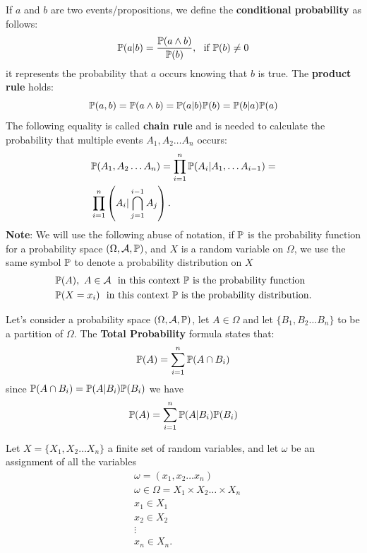 \documentclass[10pt, letterpaper]{report}
\begin{document}
If $a$ and $b$ are two events/propositions, we define the \textbf{conditional probability} as follows:\begin{equation}
	\Prob(a|b)=\frac{\Prob(a\land b)}{\Prob(b)}, \ \ \text{if }\Prob(b)\ne0
\end{equation}
it represents the probability that $a$ occurs knowing that $b$ is true. The \textbf{product rule} holds:\begin{equation}
	{\mathbb P}(a,b)={\mathbb P}(a\land b)={\mathbb P}(a|b){\mathbb P}(b)={\mathbb P}(b|a){\mathbb P}(a)
\end{equation}
The following equality is called \textbf{chain rule} and is needed to calculate the probability that multiple events $A_1,A_2\dots A_n$ occurs:\begin{align}
	 & {\mathbb P}(A_1,A_2\dots A_n)=\prod_{i=1}^n{\mathbb P}(A_i|A_1,\dots A_{i-1})=
	\\ &\prod_{i=1}^n\left( A_i|\bigcap_{j=1}^{i-1} A_j \right).
\end{align}
\textbf{Note}: We will use the following abuse of notation, if ${\mathbb P}$ is the probability function for a probability space $(\Omega,\mathcal A,{\mathbb P})$, and $X$ is a random variable on $\Omega$, we use the same symbol ${\mathbb P}$ to denote a probability distribution on $X$\begin{align}
	 & {\mathbb P}(A), \ A\in\mathcal A \ \ \text{in this context ${\mathbb P}$ is the probability function} \\
	 & {\mathbb P}(X=x_i) \ \ \text{in this context ${\mathbb P}$ is the probability distribution.}
\end{align}
\begin{theorem}
	Let's consider a probability space $(\Omega,\mathcal A, {\mathbb P})$, let $A\in \Omega$ and let $\{B_1,B_2\dots B_n\}$ to be a partition of $\Omega$. The \textbf{Total Probability} formula states that:\begin{equation}
		{\mathbb P}(A)=\sum_{i=1}^n{\mathbb P}(A\cap B_i)
	\end{equation}
	since ${\mathbb P}(A\cap B_i)={\mathbb P}(A|B_i){\mathbb P}(B_i)$ we have\begin{equation}
		{\mathbb P}(A)=\sum_{i=1}^n{\mathbb P}(A|B_i){\mathbb P}(B_i)
	\end{equation}
\end{theorem}
Let $X=\{X_1,X_2\dots X_n\}$ a finite set of random variables, and let $\omega$ be an assignment of all the variables\begin{align}
	 & \omega=(x_1,x_2\dots x_n)                     \\
	 & \omega\in\Omega=X_1\times X_2\dots \times X_n \\
	 & x_1\in X_1                                    \\
	 & x_2\in X_2                                    \\
	 & \vdots                                        \\
	 & x_n\in X_n.
\end{align}
\end{document}
